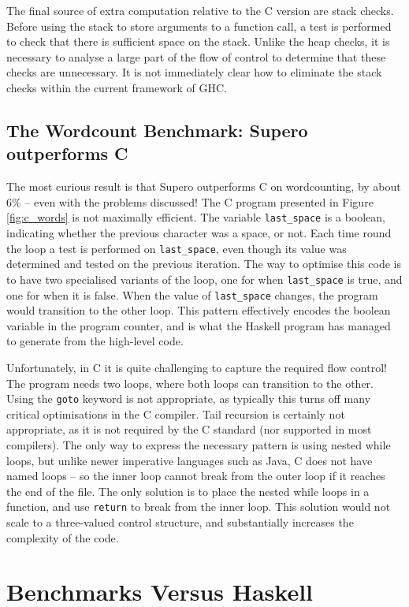 \documentclass{llncs}
\begin{document}
The final source of extra computation relative to the C version are stack checks. Before using the stack to store arguments to a function call, a test is performed to check that there is sufficient space on the stack. Unlike the heap checks, it is necessary to analyse a large part of the flow of control to determine that these checks are unnecessary. It is not immediately clear how to eliminate the stack checks within the current framework of GHC.

\subsection{The Wordcount Benchmark: Supero outperforms C}

The most curious result is that Supero outperforms C on wordcounting, by about 6\% -- even with the problems discussed! The C program presented in Figure \ref{fig:c_words} is not maximally efficient. The variable \verb"last_space" is a boolean, indicating whether the previous character was a space, or not. Each time round the loop a test is performed on \verb"last_space", even though its value was determined and tested on the previous iteration. The way to optimise this code is to have two specialised variants of the loop, one for when \verb"last_space" is true, and one for when it is false. When the value of \verb"last_space" changes, the program would transition to the other loop. This pattern effectively encodes the boolean variable in the program counter, and is what the Haskell program has managed to generate from the high-level code.

Unfortunately, in C it is quite challenging to capture the required flow control! The program needs two loops, where both loops can transition to the other. Using the \texttt{goto} keyword is not appropriate, as typically this turns off many critical optimisations in the C compiler. Tail recursion is certainly not appropriate, as it is not required by the C standard (nor supported in most compilers). The only way to express the necessary pattern is using nested while loops, but unlike newer imperative languages such as Java, C does not have named loops -- so the inner loop cannot break from the outer loop if it reaches the end of the file. The only solution is to place the nested while loops in a function, and use \texttt{return} to break from the inner loop. This solution would not scale to a three-valued control structure, and substantially increases the complexity of the code.

\section{Benchmarks Versus Haskell}
\label{sec:haskell_results}
\end{document}
